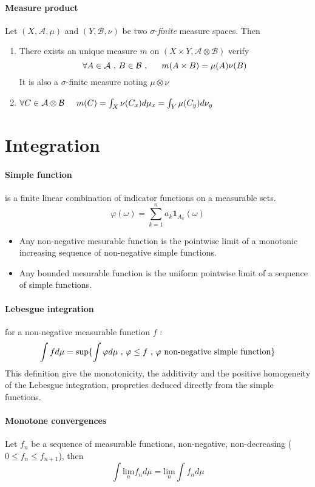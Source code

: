 \documentclass[a4paper,10pt]{article}
\begin{document}
\paragraph{Measure product} Let $(X,\mathcal{A},\mu)$ and $(Y,\mathcal{B},\nu)$ be two $\sigma$-\textit{finite} measure spaces. Then
\begin{enumerate}
 \item There exists an unique measure $m$ on $(X\times Y, \mathcal{A}\otimes \mathcal{B} )$ verify
 \[
 \forall A\in \mathcal{A} \hbox{ , } B\in\mathcal{B} \hbox{ , } \hspace{5mm} m(A\times B) = \mu(A)\nu(B)
 \]
 It is also a $\sigma$-finite measure noting $\mu \otimes \nu$
 \item $\forall C \in  \mathcal{A}\otimes \mathcal{B} \hspace{5mm}  m(C) = \int_X \nu(C_x)d\mu_x = \int_Y \mu(C_y)d\nu_y $
\end{enumerate}


\section{Integration}
\paragraph{Simple function} is a finite linear combination of indicator functions on a measurable sets. 
\[
\varphi(\omega) = \sum_{k=1}^{n} a_k \mathbf{1}_{A_k}(\omega)
\]
\begin{itemize}
 \item Any non-negative mesurable function is the pointwise limit of a monotonic increasing sequence of non-negative simple functions. 
 \item Any bounded mesurable function is the uniform pointwise limit of a sequence of simple functions.
\end{itemize}
\paragraph{Lebesgue integration } for a non-negative measurable function $f$ :
\[
\int fd\mu = \text{sup} \{ \int \varphi d\mu \hbox{ , } \varphi \leq f \hbox{ , } \varphi \text{ non-negative simple function} \}
\]
This definition give the monotonicity, the additivity and the positive homogeneity of the Lebesgue integration, propreties deduced directly from the simple functions.

\paragraph{Monotone convergences} Let $f_n$ be a sequence of measurable functions, non-negative, non-decreasing ($0 \leq f_n \leq f_{n+1}$), then
\[
\int \underset{n}{\text{lim}} f_n d\mu = \underset{n}{\text{lim}} \int  f_n d\mu 
\]
\end{document}
